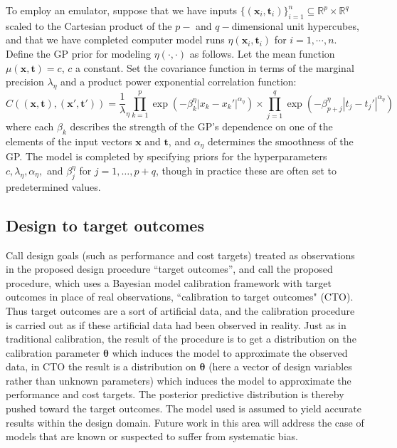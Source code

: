\documentclass[12pt]{article}
\begin{document}
%
To employ an emulator, suppose that we have inputs $\{(\mathbf x_i,\mathbf t_i)\}_{i=1}^n\subseteq \mathbb R^p\times \mathbb R^q$ scaled to the Cartesian product of the $p-$ and $q-$dimensional unit hypercubes, and that we have completed computer model runs 
%
$\eta\left(\mathbf x_i,\mathbf t_i\right)$ for $i=1,\cdots,n.$
%
Define the GP prior for modeling $\eta(\cdot,\cdot)$ as follows. 
%
Let the mean function $\mu(\mathbf x,\mathbf t)=c$, $c$ a constant. 
%
Set the covariance function in terms of the marginal precision $\lambda_\eta$ and a product power exponential correlation function:
%
\begin{equation}\label{eq:Hig_cov}
C((\mathbf x,\mathbf t),(\mathbf x',\mathbf t')) = \frac 1\lambda_\eta \prod_{k=1}^{p}
\exp \left(-\beta^\eta_k|x_k-x_k'|^{\alpha_\eta}\right) \times
\prod_{j=1}^{q}
\exp \left(-\beta^\eta_{p+j}|t_j-t_j'|^{\alpha_\eta}\right)
\end{equation}
%
where each $\beta_k$ describes the strength of the GP's dependence on one of the elements of the input vectors $\mathbf x$ and $\mathbf t$, and $\alpha_\eta$ determines the smoothness of the GP. 
%
The model is completed by specifying priors for the hyperparameters $c,\lambda_\eta,\alpha_\eta,$ and $\beta^\eta_j$ for $j=1,\ldots,p+q$, though in practice these are often set to predetermined values.
%

%
\subsection{Design to target outcomes}
%

%
Call design goals (such as performance and cost targets) treated as observations in the proposed design procedure ``target outcomes'', and call the proposed procedure, which uses a Bayesian model calibration framework with target outcomes in place of real observations, ``calibration to target outcomes" (CTO). 
%
Thus target outcomes are a sort of artificial data, and the calibration procedure is carried out as if these artificial data had been observed in reality.
%
Just as in traditional calibration, the result of the procedure is to get a distribution on the calibration parameter $\boldsymbol\theta$ which induces the model to approximate the observed data, in CTO the result is a distribution on $\boldsymbol\theta$ (here a vector of design variables rather than unknown parameters) which induces the model to approximate the performance and cost targets.
%
The posterior predictive distribution is thereby pushed toward the target outcomes.
%
%
The model used is assumed to yield accurate results within the design domain.
%
Future work in this area will address the case of models that are known or suspected to suffer from systematic bias.
%
\end{document}
